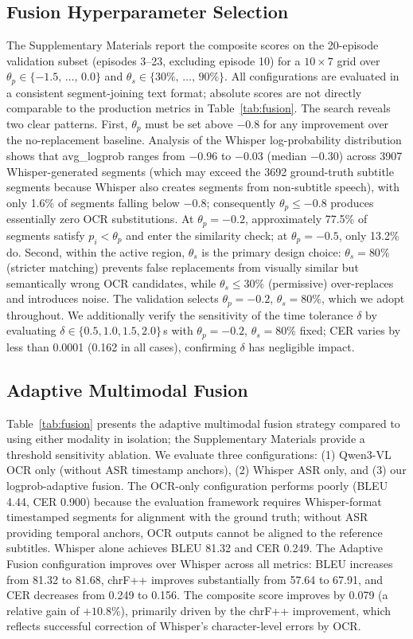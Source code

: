 \documentclass[mathematics,article,submit,xetex,moreauthors]{Definitions/mdpi}
\begin{document}
\subsection{Fusion Hyperparameter Selection}
\label{sec:param_selection}
The Supplementary Materials report the composite scores on the 20-episode validation subset (episodes 3--23, excluding episode 10) for a $10 \times 7$ grid over $\theta_p \in \{-1.5,\,\dots,\,0.0\}$ and $\theta_s \in \{30\%,\,\dots,\,90\%\}$.
All configurations are evaluated in a consistent segment-joining text format; absolute scores are not directly comparable to the production metrics in Table~\ref{tab:fusion}.
The search reveals two clear patterns.
First, $\theta_p$ must be set above $-0.8$ for any improvement over the no-replacement baseline.
Analysis of the Whisper log-probability distribution shows that avg\_logprob ranges from $-0.96$ to $-0.03$ (median $-0.30$) across 3907 Whisper-generated segments (which may exceed the 3692 ground-truth subtitle segments because Whisper also creates segments from non-subtitle speech), with only 1.6\% of segments falling below $-0.8$; consequently $\theta_p \leq -0.8$ produces essentially zero OCR substitutions.
At $\theta_p = -0.2$, approximately 77.5\% of segments satisfy $p_i < \theta_p$ and enter the similarity check; at $\theta_p = -0.5$, only 13.2\% do.
Second, within the active region, $\theta_s$ is the primary design choice: $\theta_s = 80\%$ (stricter matching) prevents false replacements from visually similar but semantically wrong OCR candidates, while $\theta_s \leq 30\%$ (permissive) over-replaces and introduces noise.
The validation selects $\theta_p = -0.2$, $\theta_s = 80\%$, which we adopt throughout.
We additionally verify the sensitivity of the time tolerance $\delta$ by evaluating $\delta \in \{0.5, 1.0, 1.5, 2.0\}$\,s with $\theta_p = -0.2$, $\theta_s = 80\%$ fixed; CER varies by less than 0.0001 (0.162 in all cases), confirming $\delta$ has negligible impact.

\subsection{Adaptive Multimodal Fusion}
\label{sec:fusion_results}
Table~\ref{tab:fusion} presents the adaptive multimodal fusion strategy compared to using either modality in isolation; the Supplementary Materials provide a threshold sensitivity ablation.
We evaluate three configurations: (1) Qwen3-VL OCR only (without ASR timestamp anchors), (2) Whisper ASR only, and (3) our logprob-adaptive fusion.
The OCR-only configuration performs poorly (BLEU 4.44, CER 0.900) because the evaluation framework requires Whisper-format timestamped segments for alignment with the ground truth; without ASR providing temporal anchors, OCR outputs cannot be aligned to the reference subtitles.
Whisper alone achieves BLEU 81.32 and CER 0.249.
The Adaptive Fusion configuration improves over Whisper across all metrics: BLEU increases from 81.32 to 81.68, chrF++ improves substantially from 57.64 to 67.91, and CER decreases from 0.249 to 0.156.
The composite score improves by 0.079 (a relative gain of $+10.8\%$), primarily driven by the chrF++ improvement, which reflects successful correction of Whisper's character-level errors by OCR.
\end{document}
